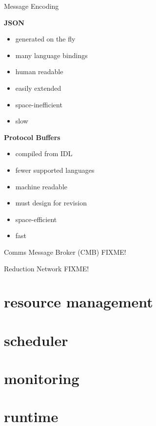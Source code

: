 \documentclass[default,pdf,colorBG,slideColor]{prosper}
\begin{document}
\begin{slide}{Message Encoding}{\small
  \hfill
  \begin{minipage}{0.5\textwidth}
  {\bf JSON}
  \begin{itemize}
    \item{generated on the fly}
    \item{many language bindings}
    \item{human readable}
    \item{easily extended}
    \item{space-inefficient}
    \item{slow}
  \end{itemize}
  \end{minipage}
  \hfill
  \begin{minipage}{0.45\textwidth}
  {\bf Protocol Buffers}
  \begin{itemize}
    \item{compiled from IDL}
    \item{fewer supported languages}
    \item{machine readable}
    \item{must design for revision}
    \item{space-efficient}
    \item{fast}
  \end{itemize}
  \end{minipage}
  \hfill
}\end{slide}
\begin{slide}{Comms Message Broker (CMB)}{\small
FIXME!
}\end{slide}
\begin{slide}{Reduction Network}{\small
FIXME!
}\end{slide}
\part{resource management}
\part{scheduler}
\part{monitoring}
\part{runtime}
\end{document}

